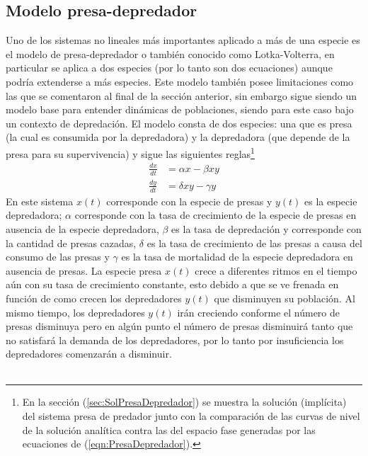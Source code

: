 \subsection{Modelo presa-depredador}\label{sec:PresaDepredadorCap1}

Uno de los sistemas no lineales más importantes aplicado a más de una especie es el modelo de presa-depredador o también conocido como Lotka-Volterra, en particular se aplica a dos especies (por lo tanto son dos ecuaciones) aunque podría extenderse a más especies. Este modelo también posee limitaciones como las que se comentaron al final de la sección anterior, sin embargo sigue siendo un modelo base para entender dinámicas de poblaciones, siendo para este caso bajo un contexto de depredación. El modelo consta de dos especies: una que es presa (la cual es consumida por la depredadora) y la depredadora (que depende de la presa para su supervivencia) y sigue las siguientes reglas\footnote{En la sección (\ref{sec:SolPresaDepredador}) se muestra la solución (implícita) del sistema presa de predador junto con la comparación de las curvas de nivel de la solución analítica contra las del espacio fase generadas por las ecuaciones de (\ref{eqn:PresaDepredador}).}
\begin{equation}\label{eqn:PresaDepredador}
	\begin{split}
		\frac{dx}{dt} &= \alpha x - \beta xy\\
		\frac{dy}{dt} &= \delta xy -\gamma y
	\end{split}
\end{equation}
En este sistema $x(t)$ corresponde con la especie de presas y $y(t)$ es la especie depredadora; $\alpha$ corresponde con la tasa de crecimiento de la especie de presas en ausencia de la especie depredadora, $\beta$ es la tasa de depredación y corresponde con la cantidad de presas cazadas, $\delta$ es la tasa de crecimiento de las presas a causa del consumo de las presas y $\gamma$ es la tasa de mortalidad de la especie depredadora en ausencia de presas. La especie presa $x(t)$ crece a diferentes ritmos en el tiempo aún con su tasa de crecimiento constante, esto debido a que se ve frenada en función de como crecen los depredadores $y(t)$ que disminuyen su población. Al mismo tiempo, los depredadores $y(t)$ irán creciendo conforme el número de presas disminuya pero en algún punto el número de presas disminuirá tanto que no satisfará la demanda de los depredadores, por lo tanto por insuficiencia los depredadores comenzarán a disminuir. \\
\\
